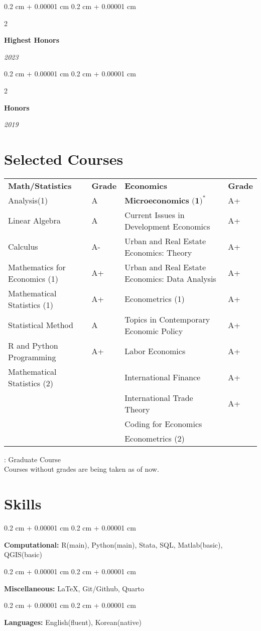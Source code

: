 \documentclass[10pt, letterpaper]{article}
\newenvironment{onecolentry}{
	\begin{adjustwidth}{
			0.2 cm + 0.00001 cm
		}{
			0.2 cm + 0.00001 cm
		}
	}{
	\end{adjustwidth}
} %
\newenvironment{twocolentry}[2][]{
	\onecolentry
	\def\secondColumn{#2}
	\setcolumnwidth{\fill, 4.5 cm}
	\begin{paracol}{2}
	}{
		\switchcolumn \raggedleft \secondColumn
	\end{paracol}
	\endonecolentry
} %
\begin{document}
\begin{twocolentry}{
		\textit{2023}    }
	\textbf{Highest Honors}
\end{twocolentry}
	
\begin{twocolentry}{
		\textit{2019}    }
	\textbf{Honors}
\end{twocolentry}
\section{Selected Courses}
\setlength{\tabcolsep}{3pt}
\begin{tabularx}{\textwidth}{|>{\centering\arraybackslash}X|>{\centering\arraybackslash}p{1cm}|>{\centering\arraybackslash}p{7
			cm}|>{\centering\arraybackslash}p{1cm}|}
	\hline
	\textbf{Math/Statistics} & \textbf{Grade} & \textbf{Economics} & \textbf{Grade} \\
	\hhline{|=|=|=|=|}
	Analysis(1) & A & $\textbf{Microeconomics (1)}^{*}$ &A+ \\ \hline
	Linear Algebra & A& Current Issues in Development Economics & A+\\ \hline
	Calculus&A-&Urban and Real Estate Economics: Theory&A+\\ \hline
	Mathematics for Economics (1)&A+&Urban and Real Estate Economics: Data Analysis&A+\\ \hline
	Mathematical Statistics (1)&A+&Econometrics (1)& A+\\ \hline
	Statistical Method & A& Topics in Contemporary Economic Policy & A+\\ \hline
	R and Python Programming&A+&Labor Economics&A+\\ \hline
	Mathematical Statistics (2)&& International Finance & A+\\ \hline
	&&International Trade Theory&A+\\ \hline
		&&Coding for Economics&\\ \hline
			&&Econometrics (2)&\\
	
	
	\hline  

\end{tabularx}
\noindent *: Graduate Course\\
\noindent Courses without grades are being taken as of now.
	

	\section{Skills}
	
	\begin{onecolentry}
		\textbf{Computational:} R(main), Python(main), Stata, SQL, Matlab(basic), QGIS(basic)
	\end{onecolentry}
	
	\vspace{0.2 cm}
	
	\begin{onecolentry}
		\textbf{Miscellaneous:} \LaTeX, Git/Github, Quarto
	\end{onecolentry}
	
	\vspace{0.2 cm}
	
	\begin{onecolentry}
		\textbf{Languages:} English(fluent), Korean(native)
	\end{onecolentry}
	
	
	
	
\end{document}
